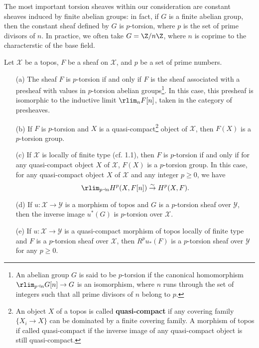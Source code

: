 The most important torsion sheaves within our consideration are constant sheaves induced by finite abelian groups: in fact, if $G$ is a finite abelian group, then the constant sheaf defined by $G$ is $p$-torsion, where $p$ is the set of prime divisors of $n$. In practice, we often take $G=\Z/n\Z$, where $n$ is coprime to the characterstic of the base field.

\begin{proposition}\label{topos p-torsion abelian sheaf prop}
Let $\mathcal{X}$ be a topos, $F$ be a sheaf on $\mathcal{X}$, and $p$ be a set of prime numbers.
\begin{enumerate}
    \item[(a)] The sheaf $F$ is $p$-torsion if and only if $F$ is the sheaf associated with a presheaf with values in $p$-torsion abelian groups\footnote{An abelian group $G$ is said to be $p$-torsion if the canonical homomorphism $\rlim_{p\dashv n} G[n]\to G$ is an isomorphism, where $n$ runs through the set of integers such that all prime divisors of $n$ belong to $p$.}. In this case, this presheaf is isomorphic to the inductive limit $\rlim_n F[n]$, taken in the category of presheaves.
    \item[(b)] If $F$ is $p$-torsion and $X$ is a quasi-compact\footnote{An object $X$ of a topos is called \textbf{quasi-compact} if any covering family $\{X_i\to X\}$ can be dominated by a finite covering family. A morphism of topos if called quasi-compact if the inverse image of any quasi-compact object is still quasi-compact.} object of $\mathcal{X}$, then $F(X)$ is a $p$-torsion group.
    \item[(c)] If $\mathcal{X}$ is locally of finite type (cf. \cite{SGA4-2}  1.1), then $F$ is $p$-torsion if and only if for any quasi-compact object $X$ of $\mathcal{X}$, $F(X)$ is a $p$-torsion group. In this case, for any quasi-compact object $X$ of $\mathcal{X}$ and any integer $p\geq 0$, we have
    \[\rlim_{p\dashv n} H^p(X,F[n])\stackrel{\sim}{\to} H^p(X,F).\]
    \item[(d)] If $u:\mathcal{X}\to\mathcal{Y}$ is a morphism of topos and $G$ is a $p$-torsion sheaf over $\mathcal{Y}$, then the inverse image $u^*(G)$ is $p$-torsion over $\mathcal{X}$.
    \item[(e)] If $u:\mathcal{X}\to\mathcal{Y}$ is a quasi-compact morphism of topos locally of finite type and $F$ is a $p$-torsion sheaf over $\mathcal{X}$, then $R^pu_*(F)$ is a $p$-torsion sheaf over $\mathcal{Y}$ for any $p\geq 0$.
\end{enumerate}
\end{proposition}
